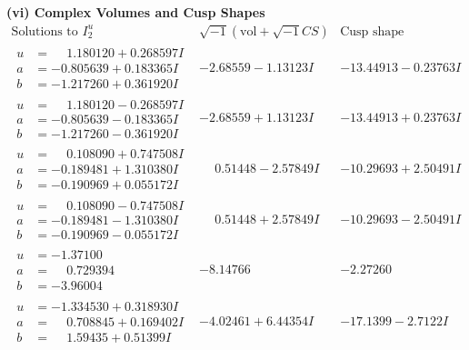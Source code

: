 \documentclass[1p]{elsarticle_modified}
\theoremstyle{definition}
\newcommand{\I}{\sqrt{-1}}
\begin{document}
\newpage\flushleft \textbf{(vi) Complex Volumes and Cusp Shapes}
$$\begin{array}{c|c|c}  
\text{Solutions to }I^u_{2}& \I (\text{vol} + \sqrt{-1}CS) & \text{Cusp shape}\\
 \hline 
\begin{aligned}
u &= \phantom{-}1.180120 + 0.268597 I \\
a &= -0.805639 + 0.183365 I \\
b &= -1.217260 + 0.361920 I\end{aligned}
 & -2.68559 - 1.13123 I & -13.44913 - 0.23763 I \\ \hline\begin{aligned}
u &= \phantom{-}1.180120 - 0.268597 I \\
a &= -0.805639 - 0.183365 I \\
b &= -1.217260 - 0.361920 I\end{aligned}
 & -2.68559 + 1.13123 I & -13.44913 + 0.23763 I \\ \hline\begin{aligned}
u &= \phantom{-}0.108090 + 0.747508 I \\
a &= -0.189481 + 1.310380 I \\
b &= -0.190969 + 0.055172 I\end{aligned}
 & \phantom{-}0.51448 - 2.57849 I & -10.29693 + 2.50491 I \\ \hline\begin{aligned}
u &= \phantom{-}0.108090 - 0.747508 I \\
a &= -0.189481 - 1.310380 I \\
b &= -0.190969 - 0.055172 I\end{aligned}
 & \phantom{-}0.51448 + 2.57849 I & -10.29693 - 2.50491 I \\ \hline\begin{aligned}
u &= -1.37100\phantom{ +0.000000I} \\
a &= \phantom{-}0.729394\phantom{ +0.000000I} \\
b &= -3.96004\phantom{ +0.000000I}\end{aligned}
 & -8.14766\phantom{ +0.000000I} & -2.27260\phantom{ +0.000000I} \\ \hline\begin{aligned}
u &= -1.334530 + 0.318930 I \\
a &= \phantom{-}0.708845 + 0.169402 I \\
b &= \phantom{-}1.59435 + 0.51399 I\end{aligned}
 & -4.02461 + 6.44354 I & -17.1399 - 2.7122 I \\ \hline\begin{aligned}

\end{aligned}
\end{array}$$
\end{document}
